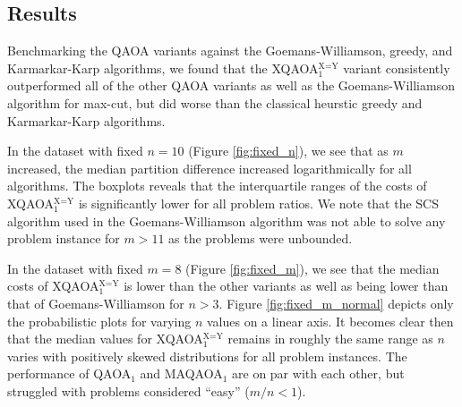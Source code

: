 \subsection{Results}

Benchmarking the QAOA variants against the Goemans-Williamson, greedy, and Karmarkar-Karp algorithms, we found that the XQAOA$_1^\text{X=Y}$ variant consistently outperformed all of the other QAOA variants as well as the Goemans-Williamson algorithm for max-cut, but did worse than the classical heurstic greedy and Karmarkar-Karp algorithms. 

In the dataset with fixed $n=10$ (Figure \ref{fig:fixed_n}), we see that as $m$ increased, the median partition difference increased logarithmically for all algorithms. The boxplots reveals that the interquartile ranges of the costs of XQAOA$_1^\text{X=Y}$ is significantly lower for all problem ratios. We note that the SCS algorithm used in the Goemans-Williamson algorithm was not able to solve any problem instance for $m>11$ as the problems were unbounded.

In the dataset with fixed $m=8$ (Figure \ref{fig:fixed_m}), we see that the median costs of XQAOA$_1^\text{X=Y}$ is lower than the other variants as well as being lower than that of Goemans-Williamson for $n>3$. Figure \ref{fig:fixed_m_normal} depicts only the probabilistic plots for varying $n$ values on a linear axis. It becomes clear then that the median values for XQAOA$_1^\text{X=Y}$ remains in roughly the same range as $n$ varies with positively skewed distributions for all problem instances. The performance of QAOA$_1$ and MAQAOA$_1$ are on par with each other, but struggled with problems considered ``easy'' ($m/n <1$).








